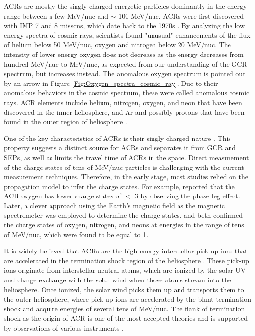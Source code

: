 \acp{ACR} are mostly the singly charged energetic particles dominantly in the energy range between a few MeV/nuc and $\sim$ 100 MeV/nuc. \acp{ACR} were first discovered with \ac{IMP} 7 and 8 missons, which date back to the 1970s \citep{Garcia1973ICRC, Hoverstadt1973PhRvL, McDonald1974ApJ}. By analyzing the low energy spectra of cosmic rays, scientists found "unusual" enhancements of the flux of helium below 50 MeV/nuc, oxygen and nitrogen below 20 MeV/nuc. The intensity of lower energy oxygen does not decrease as the energy decreases from hundred MeV/nuc to MeV/nuc, as expected from our understanding of the \ac{GCR} spectrum, but increases instead. The anomalous oxygen spectrum is pointed out by an arrow in Figure \ref{Fig:Oxygen_spectra_cosmic_ray}. Due to their anomalous behaviors in the cosmic spectrum, these were called anomalous cosmic rays. \ac{ACR} elements include helium, nitrogen, oxygen, and neon that have been discovered in the inner heliosphere, and Ar and possibly protons that have been found in the outer region of heliosphere \citep{Klecker1995SSRv}.

One of the key characteristics of \acp{ACR} is their singly charged nature \citep{Klecker1980GeoRL,Adams1991ApJ, Klecker1995ApJ}. This property suggests a distinct source for \acp{ACR} and separates it from \ac{GCR} and \acp{SEP}, as well as limits the travel time of \acp{ACR} in the space. Direct measurement of the charge states of tens of MeV/nuc particles is challenging with the current measurement techniques. Therefore, in the early stage, most studies relied on the propagation model to infer the charge states. For example, \citet{Klecker1980GeoRL} reported that the \ac{ACR} oxygen has lower charge states of $<$ 3 by observing the phase leg effect. Later, a clever approach using the Earth's magnetic field as the magnetic spectrometer was employed to determine the charge states. \citet{Adams1991ApJ} and \citet{Klecker1995ApJ} both confirmed the charge states of oxygen, nitrogen, and neons at energies in the range of tens of MeV/nuc, which were found to be equal to 1.

It is widely believed that \acp{ACR} are the high energy interstellar pick-up ions that are accelerated in the termination shock region of the heliosphere \citep{Fisk1974ApJ}. These pick-up ions originate from interstellar neutral atoms, which are ionized by the solar \ac{UV} and charge exchange with the solar wind when those atoms stream into the heliosphere. Once ionized, the solar wind picks them up and transports them to the outer heliosphere, where pick-up ions are accelerated by the blunt termination shock \citep{McComas2006GeoRL} and acquire energies of several tens of MeV/nuc. The flank of termination shock as the origin of \ac{ACR} is one of the most accepted theories and is supported by observations of various instruments \citep{McComas2019ApJ, Cummings2019ICRC}. 

